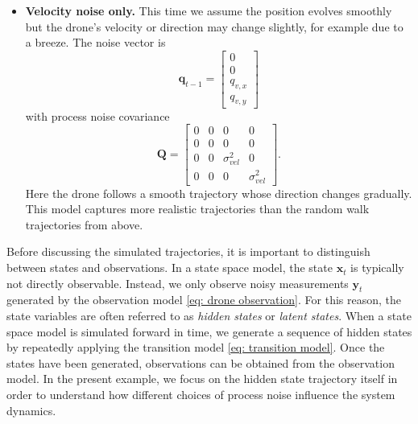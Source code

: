 \begin{example}
\begin{itemize}
    where $q_{p,x},q_{p,y} \sim \mathcal{N}(0,\sigma_{\text{pos}}^2)$ with 
    covariance matrix
    \[
    \mathbf{Q} =
    \begin{bmatrix}
        \sigma_\text{pos}^2 & 0 & 0 & 0 \\
        0 & \sigma_\text{pos}^2 & 0 & 0 \\
        0 & 0 & 0 & 0 \\
        0 & 0 & 0 & 0 
    \end{bmatrix}
    \]
    In this case, the drone moves add a random walk step after moving according to the fixed velocity. This results in a trajectory with sharp edges.  
    
    \item{\textbf{Velocity noise only.}}
    This time we assume the position evolves smoothly but the drone's velocity or direction may change slightly, for example due to a breeze. The noise vector is
    \[
    \mathbf{q}_{t-1}= \begin{bmatrix}
        0 \\
        0 \\
        q_{v,x} \\
        q_{v,y}
    \end{bmatrix}
    \]
     with process noise covariance
    \[
      \mathbf{Q} = \begin{bmatrix}
        0 & 0 & 0 & 0 \\
        0 & 0 & 0 & 0 \\
        0 & 0 & \sigma^{2}_{vel} & 0 \\
        0 & 0 & 0 & \sigma^{2}_{vel}
      \end{bmatrix}.
    \]
    Here the drone follows a smooth trajectory whose direction changes gradually. This model captures more realistic trajectories than the random walk trajectories from above.
\end{itemize}

Before discussing the simulated trajectories, it is important to distinguish between states and observations. In a state space model, the state $\mathbf{x}_t$ is typically not directly observable. Instead, we only observe noisy measurements $\mathbf{y}_t$ generated by the observation model \eqref{eq: drone observation}. For this reason, the state variables are often referred to as \emph{hidden states} or \emph{latent states}. When a state space model is simulated forward in time, we generate a sequence of hidden states by repeatedly applying the transition model \eqref{eq: transition model}. Once the states have been generated, observations can be obtained from the observation model. In the present example, we focus on the hidden state trajectory itself in order to understand how different choices of process noise influence the system dynamics.


\end{example}
